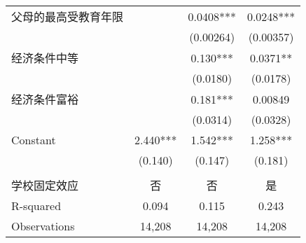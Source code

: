 \documentclass{beamer}
\begin{document}
\begin{frame}
\begin{table}[!htbp]
{\begin{tabular}{lccc}
父母的最高受教育年限   &           & 0.0408***  & 0.0248*** \\
             &           & (0.00264)  & (0.00357) \\
经济条件中等       &           & 0.130***   & 0.0371**  \\
             &           & (0.0180)   & (0.0178)  \\
经济条件富裕       &           & 0.181***   & 0.00849   \\
             &           & (0.0314)   & (0.0328)  \\
Constant     & 2.440***  & 1.542***   & 1.258***  \\
             & (0.140)   & (0.147)    & (0.181)   \\
             &           &            &          \\
学校固定效应  & 否    	& 否     	& 是  \\
R-squared    & 0.094     & 0.115      & 0.243 \\
Observations & 14,208    & 14,208     & 14,208    \\
\hline
\end{tabular}}
\end{table}
\end{frame}
\end{document}
